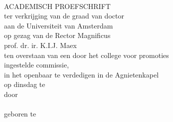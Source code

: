 
\begin{titlepage}
\begin{center}

{\sffamily \Huge \thesistitle}
\vspace{2cm}
\\
{\sffamily \LARGE ACADEMISCH PROEFSCHRIFT}
\\
\vspace{1.5cm}
ter verkrijging van de graad van doctor
\\
aan de Universiteit van Amsterdam
\\
op gezag van de Rector Magnificus \todo{}
\\
prof. dr. ir. K.I.J. Maex \todo{}
\\
ten overstaan van een door het college voor promoties
\\
ingestelde commissie,
\\
in het openbaar te verdedigen in de Agnietenkapel \todo
\\
op dinsdag  te 
\\
\vspace{0.8cm}
door
\vspace{1.0cm}
\\
{\sffamily \LARGE \thesisauthorfull}
\\
\vspace{0.4cm}
geboren te 

\end{center}
\end{titlepage}

\newpage
\thispagestyle{empty}